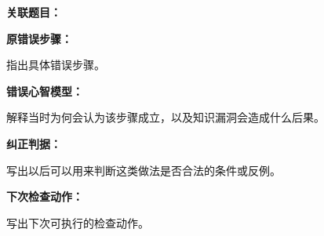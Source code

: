 
\begin{mistakeBox}
\textbf{关联题目：} 

\textbf{原错误步骤：}

指出具体错误步骤。

\textbf{错误心智模型：}

解释当时为何会认为该步骤成立，以及知识漏洞会造成什么后果。

\textbf{纠正判据：}

写出以后可以用来判断这类做法是否合法的条件或反例。

\textbf{下次检查动作：}

写出下次可执行的检查动作。
\end{mistakeBox}
